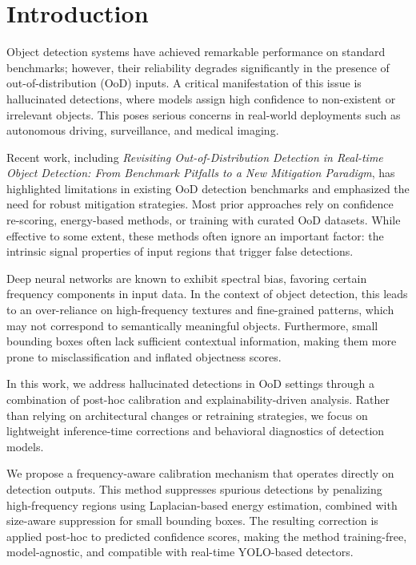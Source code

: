 \section{Introduction}
\label{sec:intro}

Object detection systems have achieved remarkable performance on standard benchmarks; however, their reliability degrades significantly in the presence of out-of-distribution (OoD) inputs. A critical manifestation of this issue is hallucinated detections, where models assign high confidence to non-existent or irrelevant objects. This poses serious concerns in real-world deployments such as autonomous driving, surveillance, and medical imaging.

Recent work, including \textit{Revisiting Out-of-Distribution Detection in Real-time Object Detection: From Benchmark Pitfalls to a New Mitigation Paradigm}, has highlighted limitations in existing OoD detection benchmarks and emphasized the need for robust mitigation strategies. Most prior approaches rely on confidence re-scoring, energy-based methods, or training with curated OoD datasets. While effective to some extent, these methods often ignore an important factor: the intrinsic signal properties of input regions that trigger false detections.

Deep neural networks are known to exhibit spectral bias, favoring certain frequency components in input data. In the context of object detection, this leads to an over-reliance on high-frequency textures and fine-grained patterns, which may not correspond to semantically meaningful objects. Furthermore, small bounding boxes often lack sufficient contextual information, making them more prone to misclassification and inflated objectness scores.

In this work, we address hallucinated detections in OoD settings through a combination of post-hoc calibration and explainability-driven analysis. Rather than relying on architectural changes or retraining strategies, we focus on lightweight inference-time corrections and behavioral diagnostics of detection models.

We propose a frequency-aware calibration mechanism that operates directly on detection outputs. This method suppresses spurious detections by penalizing high-frequency regions using Laplacian-based energy estimation, combined with size-aware suppression for small bounding boxes. The resulting correction is applied post-hoc to predicted confidence scores, making the method training-free, model-agnostic, and compatible with real-time YOLO-based detectors.

